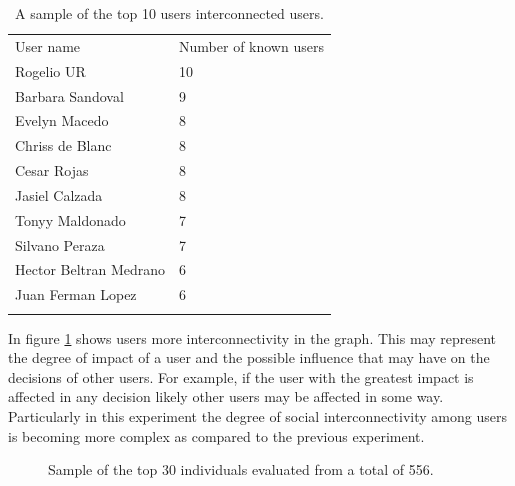 \begin{table}
\small
\caption{A sample of the top 10 users interconnected users.}
\label{tab:knownUsers_2} 
\centering
\small
\begin{tabular}{p{3cm} p{3cm}  }
\hline\noalign{\smallskip}
 User name & Number of known users \\
\noalign{\smallskip}\hline\noalign{\smallskip}
\small{Rogelio UR} & \small{10}  \\ \hline 
\small{Barbara Sandoval} & \small{9}  \\ \hline
\small{Evelyn Macedo} & \small{8}  \\ \hline
\small{Chriss de Blanc} & \small{8}  \\ \hline
\small{Cesar Rojas} & \small{8}  \\ \hline
\small{Jasiel Calzada} & \small{8}  \\ \hline
\small{Tonyy Maldonado} & \small{7}  \\ \hline
\small{Silvano Peraza} & \small{7}  \\ \hline 
\small{Hector Beltran Medrano} & \small{6}  \\ \hline 
\small{Juan Ferman Lopez} & \small{6}  \\ \hline 
\noalign{\smallskip}\hline
\end{tabular}
\end{table}

In figure \ref{fig:bestIndividuals_2} shows users more interconnectivity in the
graph. This may represent the degree of impact of a user and the possible
influence that may have on the decisions of other users.  For example, if the
user with the greatest impact is affected in any decision likely other users may
be affected in some way. Particularly in this experiment the degree of social
interconnectivity among users is becoming more complex as compared to the
previous experiment.

\begin{figure}
\centering
{} %
\caption{Sample of the top 30 individuals evaluated from a total of 556.}
\label{fig:bestIndividuals_2}   
\end{figure}

